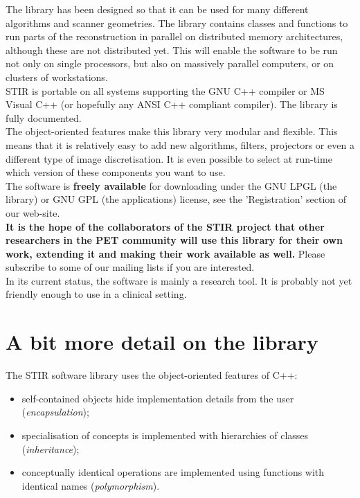 \documentclass{article}
\begin{document}
The library has been designed so that it can be used for many 
different algorithms and scanner geometries. The library contains 
classes and functions to run parts of the reconstruction in parallel 
on distributed memory architectures, although these are not distributed 
yet. This will enable the software to be run not only on single 
processors, but also on massively parallel computers, or on clusters 
of workstations. \\
STIR is portable on all systems supporting the GNU C++ compiler 
or MS Visual C++ (or hopefully any ANSI C++ compliant compiler). 
The library is fully documented.\\
The object-oriented features make this library very modular and 
flexible. This means that it is relatively easy to add new algorithms, 
filters, projectors or even a different type of image discretisation. 
It is even possible to select at run-time which version of these 
components you want to use.\\
The software is \textbf{freely available} for downloading under the 
GNU LPGL (the library) or GNU GPL (the applications) license, 
see the 'Registration' section of our web-site. \\
\textbf{It is the hope of the collaborators of the STIR project that 
other researchers in the PET community will use this library 
for their own work, extending it and making their work available 
as well.} Please subscribe to some of our mailing 
lists if you are interested. \\
In its current status, the software is mainly a research tool. 
It is probably not yet friendly enough to use in a clinical setting.




\section{
A bit more detail on the library}

The STIR software library uses the object-oriented features of 
C++:

\begin{itemize}

\item self-contained objects hide implementation details from the user 
(\textit{encapsulation});
\item specialisation of concepts is implemented with hierarchies 
of classes (\textit{inheritance});
\item conceptually identical operations are implemented using 
functions with identical names (\textit{polymorphism}).
\end{itemize}
\end{document}
